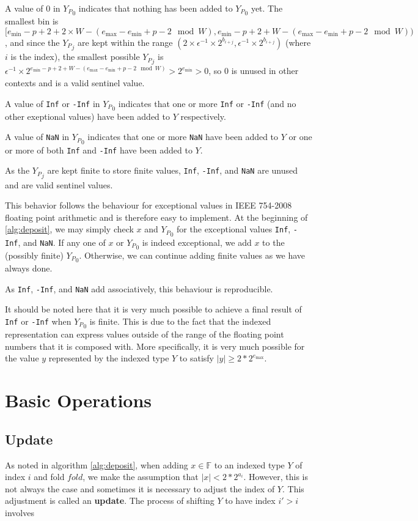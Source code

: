\documentclass[12pt]{article}
\providecommand{\F}{\ensuremath{\mathbb{F}}}
\providecommand{\min}{\ensuremath{\text{min}}}
\providecommand{\max}{\ensuremath{\text{max}}}
\theoremstyle{plain}
\begin{document}
      A value of $0$ in ${Y_P}_0$ indicates that nothing has been added to ${Y_P}_0$ yet. The smallest bin is $[e_{\min} - p + 2 + 2\times W - (e_{\max} - e_{\min} + p - 2 \mod W), e_{\min} - p + 2 + W - (e_{\max} - e_{\min} + p - 2 \mod W))$, and since the ${Y_P}_j$ are kept within the range $(2 \times \epsilon^{-1} \times 2^{b_{i + j}}, \epsilon^{-1} \times 2^{b_{i + j}})$ (where $i$ is the index), the smallest possible ${Y_P}_j$ is $\epsilon^{-1} \times 2^{e_{\min} - p + 2 + W - (e_{\max} - e_{\min} + p - 2 \mod W)} > 2^{e_{\min}} > 0$, so $0$ is unused in other contexts and is a valid sentinel value.

      A value of \verb|Inf| or \verb|-Inf| in ${Y_P}_0$ indicates that one or more \verb|Inf| or \verb|-Inf| (and no other exeptional values) have been added to $Y$ respectively.

      A value of \verb|NaN| in ${Y_P}_0$ indicates that one or more \verb|NaN| have been added to $Y$ or one or more of both \verb|Inf| and \verb|-Inf| have been added to $Y$.

      As the ${Y_P}_j$ are kept finite to store finite values, \verb|Inf|, \verb|-Inf|, and \verb|NaN| are unused and are valid sentinel values.

      This behavior follows the behaviour for exceptional values in IEEE 754-2008 floating point arithmetic and is therefore easy to implement. At the beginning of \ref{alg:deposit}, we may simply check $x$ and ${Y_P}_0$ for the exceptional values \verb|Inf|, \verb|-Inf|, and \verb|NaN|. If any one of $x$ or ${Y_P}_0$ is indeed exceptional, we add $x$ to the (possibly finite) ${Y_P}_0$. Otherwise, we can continue adding finite values as we have always done.

      As \verb|Inf|, \verb|-Inf|, and \verb|NaN| add associatively, this behaviour is reproducible.

      It should be noted here that it is very much possible to achieve a final result of \verb|Inf| or \verb|-Inf| when ${Y_P}_0$ is finite. This is due to the fact that the indexed representation can express values outside of the range of the floating point numbers that it is composed with. More specifically, it is very much possible for the value $y$ represented by the indexed type $Y$ to satisfy $|y| \geq 2 * 2^{e_{\max}}$.

\section{Basic Operations}
  \subsection{Update}
    As noted in algorithm \ref{alg:deposit}, when adding $x \in \F$ to an indexed type $Y$ of index $i$ and fold $fold$, we make the assumption that $|x| < 2 * 2^{a_i}$. However, this is not always the case and sometimes it is necessary to adjust the index of $Y$. This adjustment is called an \textbf{update}. The process of shifting $Y$ to have index $i' > i$ involves
\end{document}
